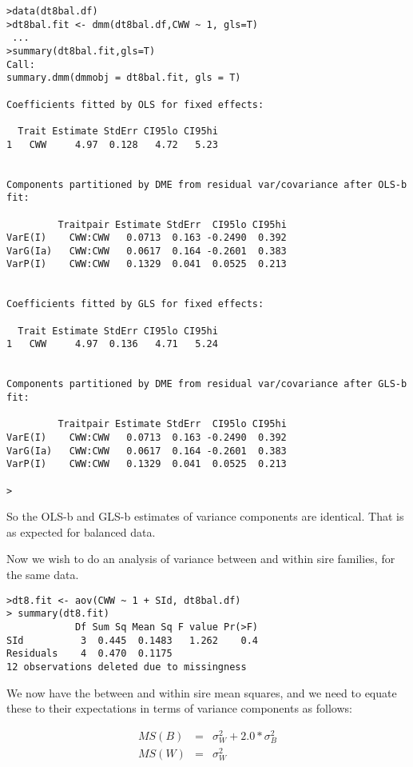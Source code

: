 \documentclass[titlepage]{article}  %
\begin{document}
\begin{verbatim}
>data(dt8bal.df)
>dt8bal.fit <- dmm(dt8bal.df,CWW ~ 1, gls=T)
 ...
>summary(dt8bal.fit,gls=T)
Call:
summary.dmm(dmmobj = dt8bal.fit, gls = T)

Coefficients fitted by OLS for fixed effects:

  Trait Estimate StdErr CI95lo CI95hi
1   CWW     4.97  0.128   4.72   5.23


Components partitioned by DME from residual var/covariance after OLS-b fit:

         Traitpair Estimate StdErr  CI95lo CI95hi
VarE(I)    CWW:CWW   0.0713  0.163 -0.2490  0.392
VarG(Ia)   CWW:CWW   0.0617  0.164 -0.2601  0.383
VarP(I)    CWW:CWW   0.1329  0.041  0.0525  0.213


Coefficients fitted by GLS for fixed effects:

  Trait Estimate StdErr CI95lo CI95hi
1   CWW     4.97  0.136   4.71   5.24


Components partitioned by DME from residual var/covariance after GLS-b fit:

         Traitpair Estimate StdErr  CI95lo CI95hi
VarE(I)    CWW:CWW   0.0713  0.163 -0.2490  0.392
VarG(Ia)   CWW:CWW   0.0617  0.164 -0.2601  0.383
VarP(I)    CWW:CWW   0.1329  0.041  0.0525  0.213

> 
\end{verbatim}
 
So the OLS-b and GLS-b estimates of variance components are identical. That is as expected for balanced data.

Now we wish to do an analysis of variance between and within sire families, for the same data.

\begin{verbatim}
>dt8.fit <- aov(CWW ~ 1 + SId, dt8bal.df)
> summary(dt8.fit)
            Df Sum Sq Mean Sq F value Pr(>F)
SId          3  0.445  0.1483   1.262    0.4
Residuals    4  0.470  0.1175               
12 observations deleted due to missingness
\end{verbatim}

We now have the between and within sire mean squares, and we need to equate these to their expectations in terms of variance components as follows:

\begin{eqnarray*}
MS(B) & = & \sigma^{2}_{W} + 2.0 * \sigma^{2}_{B} \\
MS(W) & = & \sigma^{2}_{W}
\end{eqnarray*}
\end{document}
